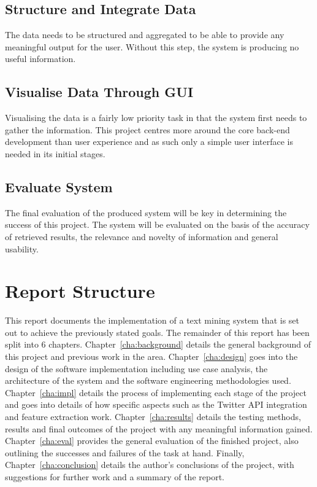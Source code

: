 \subsection{Structure and Integrate Data}
The data needs to be structured and aggregated to be able to provide any meaningful output for the user. Without this step, the system is producing no useful information.

\subsection{Visualise Data Through GUI}
Visualising the data is a fairly low priority task in that the system first needs to gather the information. This project centres more around the core back-end development than user experience and as such only a simple user interface is needed in its initial stages.

\subsection{Evaluate System}
The final evaluation of the produced system will be key in determining the success of this project. The system will be evaluated on the basis of the accuracy of retrieved results, the relevance and novelty of information and general usability.

\section{Report Structure}
This report documents the implementation of a text mining system that is set out to achieve the previously stated goals. The remainder of this report has been split into 6 chapters. Chapter~\ref{cha:background} details the general background of this project and previous work in the area.
Chapter~\ref{cha:design} goes into the design of the software implementation including use case analysis, the architecture of the system and the software engineering methodologies used.
Chapter~\ref{cha:impl} details the process of implementing each stage of the project and goes into details of how specific aspects such as the Twitter API integration and feature extraction work.
Chapter~\ref{cha:results} details the testing methods, results and final outcomes of the project with any meaningful information gained.
Chapter~\ref{cha:eval} provides the general evaluation of the finished project, also outlining the successes and failures of the task at hand.
Finally, Chapter~\ref{cha:conclusion} details the author's conclusions of the project, with suggestions for further work and a summary of the report.